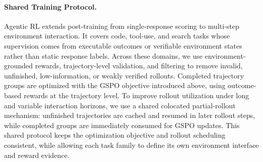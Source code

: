 \documentclass{article} %
\begin{document}


\paragraph{Shared Training Protocol.}
Agentic RL extends post-training from single-response scoring to multi-step environment interaction. It covers code, tool-use, and search tasks whose supervision comes from executable outcomes or verifiable environment states rather than static response labels. Across these domains, we use environment-grounded rewards, trajectory-level validation, and filtering to remove invalid, unfinished, low-information, or weakly verified rollouts. Completed trajectory groups are optimized with the GSPO objective introduced above, using outcome-based rewards at the trajectory level. To improve rollout utilization under long and variable interaction horizons, we use a shared colocated partial-rollout mechanism: unfinished trajectories are cached and resumed in later rollout steps, while completed groups are immediately consumed for GSPO updates. This shared protocol keeps the optimization objective and rollout scheduling consistent, while allowing each task family to define its own environment interface and reward evidence.
\end{document}
